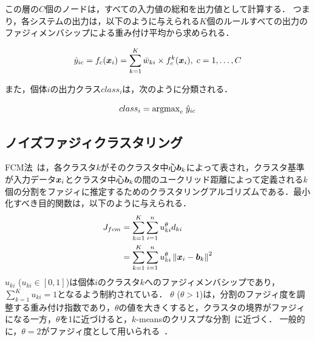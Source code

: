 \documentclass{ujarticle}
\begin{document}
この層の$C$個のノードは，すべての入力値の総和を出力値として計算する．
つまり，各システムの出力は，以下のように与えられる$K$個のルールすべての出力のファジィメンバシップによる重み付け平均から求められる．

\begin{equation}
	\hat{y}_{ic} = f_c (\mbox{\boldmath $x$}_{i}) = \sum_{k=1}^K \bar{w}_{ki} \times f_{c}^k (\mbox{\boldmath $x$}_{i}), \; c=1, \dots, C
\end{equation}

また，個体$i$の出力クラス$class_i$は，次のように分類される．

\begin{equation}
	class_i = {\rm argmax}_{c} \; \hat{y}_{ic}
\end{equation}

\subsection{ノイズファジィクラスタリング}

FCM法~\cite{Bezdek81a}は，各クラスタ$k$がそのクラスタ中心$\mbox{\boldmath $b$}_k$によって表され，クラスタ基準が入力データ$\mbox{\boldmath $x$}_i$とクラスタ中心$\mbox{\boldmath $b$}_k$の間のユークリッド距離によって定義される$k$個の分割をファジィに推定するためのクラスタリングアルゴリズムである．最小化すべき目的関数は，以下のように与えられる．
\begin{equation}
\begin{aligned}[b]
J_{fcm} &=\sum_{k=1}^{K} \sum_{i=1}^{n} u_{k i}^{\theta} d_{k i} \\
&=\sum_{k=1}^{K} \sum_{i=1}^{n} u_{k i}^{\theta}\left\|\mbox{\boldmath $x$}_{i}-\mbox{\boldmath $b$}_{k}\right\|^{2}
\end{aligned}
\label{eq: object FCM}
\end{equation}
$u_{ki}$ ($u_{ki} \in [0, 1]$)は個体$i$のクラスタ$k$へのファジィメンバシップであり，$\sum_{k=1}^K u_{ki} = 1$となるよう制約されている．
$\theta$ ($\theta > 1$)は，分割のファジィ度を調整する重み付け指数であり，$\theta$の値を大きくすると，クラスタの境界がファジィになる一方，$\theta$を1に近づけると，$k$-meansのクリスプな分割~\cite{MacQueen67}に近づく．
一般的に，$\theta = 2$がファジィ度として用いられる~\cite{Bezdek81a}．
\end{document}
